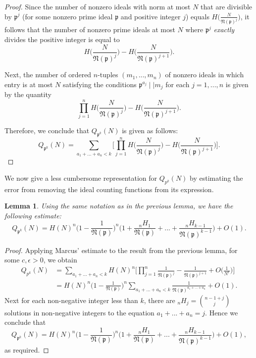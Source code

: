 \documentclass[12pt]{amsart}
\newtheorem{lemma}[theorem]{Lemma}
\theoremstyle{definition}
\newcommand{\f}[1]{\mathfrak{#1}}
\begin{document}
\begin{proof}
	Since the number of nonzero ideals with norm at most $N$ that are divisible by $\f{p}^j$ (for some nonzero prime ideal $\f{p}$ and positive integer $j$) equals $H\big(\frac{N}{\f{N}(\f{p})^j}\big)$, it follows that the number of nonzero prime ideals at most $N$ where $\f{p}^j$ \textit{exactly} divides the positive integer is equal to
	$$H\bigg(\frac{N}{\f{N}(\f{p})^j}\bigg) - H\bigg(\frac{N}{\f{N}(\f{p})^{j+1}}\bigg).$$
	
	\noindent Next, the number of ordered $n$-tuples $(m_1, ..., m_n)$ of nonzero ideals in which entry is at most $N$ satisfying the conditions $\f{p}^{a_j} \mid\mid m_j$ for each $j = 1, ..., n$ is given by the quantity
	$$\prod_{j=1}^n H\bigg(\frac{N}{\f{N}(\f{p})^j}\bigg) - H\bigg(\frac{N}{\f{N}(\f{p})^{j+1}}\bigg).$$
	
	\noindent Therefore, we conclude that $Q_{\f{p}^k}(N)$ is given as follows:
	$$Q_{\f{p}^k}(N) = \sum_{a_1+...+a_n < k} \bigg[\prod_{j=1}^n H\bigg(\frac{N}{\f{N}(\f{p})^j}\bigg) - H\bigg(\frac{N}{\f{N}(\f{p})^{j+1}}\bigg)\bigg].$$ 
\end{proof}

We now give a less cumbersome representation for $Q_{p^k}(N)$ by estimating the error from removing the ideal counting functions from its expression.

\begin{lemma}
	Using the same notation as in the previous lemma, we have the following estimate:
	$$Q_{\f{p}^k}(N) = H(N)^n\Big(1 - \frac{1}{\f{N}(\f{p})}\Big)^n \Big(1 + \frac{{}_nH_1}{\f{N}(\f{p})} + ... + \frac{{}_nH_{k-1}}{\f{N}(\f{p})^{k-1}}\Big) + O(1).$$
\end{lemma}

\begin{proof}
	Applying Marcus' estimate to the result from the previous lemma, for some $c,\epsilon>0$, we obtain
	\begin{align*} 
		Q_{p^k}(N) &= \sum_{a_1+...+a_n < k} H(N)^n\Big[\prod_{j=1}^n \frac{1}{\f{N}(\f{p})^j}-\frac{1}{\f{N}(\f{p})^{j+1}}+O\bigg(\frac{1}{N^\epsilon}\bigg)\Big]\\ 
		&= H(N)^n\Big(1 - \frac{1}{\f{N}(\f{p})}\Big)^n \sum_{a_1+...+a_n < k} \frac{1}{\f{N}(\f{p})^{a_1 + ... + a_n}} + O(1). 
	\end{align*} 
	\noindent Next for each non-negative integer less than $k$, there are \small${}_nH_j = \binom{n-1+j}{j}\ $ \normalsize  solutions in non-negative integers to the equation $a_1+...+a_n = j$. Hence we conclude that
	$$Q_{\f{p}^k}(N) = H(N)^n\Big(1 - \frac{1}{\f{N}(\f{p})}\Big)^n \Big(1 + \frac{{}_nH_1}{\f{N}(\f{p})} + ... + \frac{{}_nH_{k-1}}{\f{N}(\f{p})^{k-1}}\Big) + O(1),$$
	as required.
\end{proof}
\end{document}
